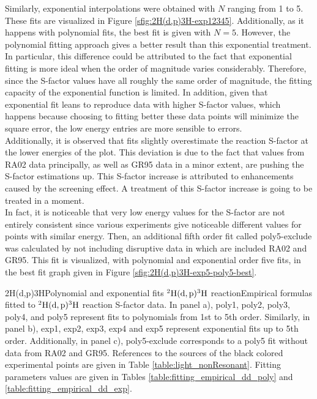 \documentclass[openany]{book}
\begin{document}
Similarly, exponential interpolations were obtained with $N$ ranging from 1 to 5. These fits are visualized in Figure \ref{sfig:2H(d,p)3H-exp12345}. Additionally, as it happens with polynomial fits, the best fit is given with $N = 5$. However, the polynomial fitting approach gives a better result than this exponential treatment. \\

In particular, this difference could be attributed to the fact that exponential fitting is more ideal when the order of magnitude varies considerably. Therefore, since the S-factor values have all roughly the same order of magnitude, the fitting capacity of the exponential function is limited. In addition, given that exponential fit leans to reproduce data with higher S-factor values, which happens because choosing to fitting better these data points will minimize the square error, the low energy entries are more sensible to errors.  \\

Additionally, it is observed that fits slightly overestimate the reaction S-factor at the lower energies of the plot. This deviation is due to the fact that values from RA02 data principally, as well as GR95 data in a minor extent, are pushing the S-factor estimations up. This S-factor increase is attributed to enhancements caused by the screening effect. A treatment of this S-factor increase is going to be treated in a moment. \\

 In fact, it is noticeable that very low energy values for the S-factor are not entirely consistent since various experiments give noticeable different values for points with similar energy. Then, an additional fifth order fit called poly5-exclude was calculated by not including disruptive data in which are included RA02 and GR95. This fit is visualized, with polynomial and exponential order five fits, in the best fit graph given in Figure \ref{sfig:2H(d,p)3H-exp5-poly5-best}.

{2H(d,p)3H}{Polynomial and exponential fits $\mathrm{{}^{2}H(d, p){}^{3}H}$ reaction}{Empirical formulas fitted to $\mathrm{{}^{2}H(d, p){}^{3}H}$ reaction S-factor data. In panel a), poly1, poly2, poly3, poly4, and poly5 represent fits to polynomials from 1st to 5th order.  Similarly, in panel b), exp1, exp2, exp3, exp4 and exp5 represent exponential fits up to 5th order. Additionally, in panel c), poly5-exclude corresponds to a poly5 fit without data from RA02 and GR95. References to the sources of the black colored experimental points are given in Table \ref{table:light_nonResonant}. Fitting parameters values are given in Tables \ref{table:fitting_empirical_dd_poly} and \ref{table:fitting_empirical_dd_exp}.}
\end{document}
